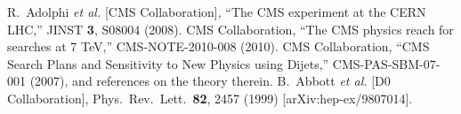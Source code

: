 \documentclass{PoS}
\begin{document}
\begin{thebibliography}{0}
  R.~Adolphi {\it et al.}  [CMS Collaboration],
  ``The CMS experiment at the CERN LHC,''
  JINST {\bf 3}, S08004 (2008).
  CMS Collaboration,
  ``The CMS physics reach for searches at 7 TeV,''
  CMS-NOTE-2010-008 (2010).
 CMS Collaboration,
 ``CMS Search Plans and Sensitivity to New Physics using Dijets,''
 CMS-PAS-SBM-07-001 (2007), and references on the theory therein.
  B.~Abbott {\it et al.}  [D0 Collaboration],
  Phys.\ Rev.\ Lett.\  {\bf 82}, 2457 (1999)
  [arXiv:hep-ex/9807014].

\end{thebibliography}
\end{document}
